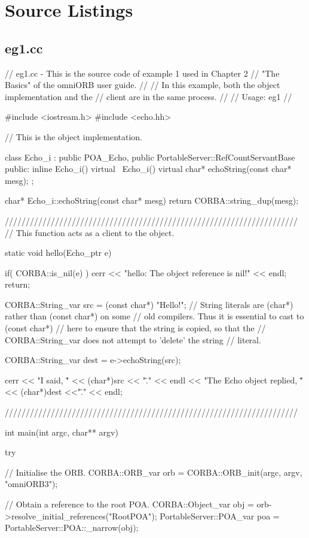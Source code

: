 \documentclass[11pt,twoside,a4paper]{book}
\begin{document}
\clearpage
\section{Source Listings}

\subsection{eg1.cc}

\begin{cxxlisting}
// eg1.cc - This is the source code of example 1 used in Chapter 2
//          "The Basics" of the omniORB user guide.
//
//          In this example, both the object implementation and the
//          client are in the same process.
//
// Usage: eg1
//

#include <iostream.h>
#include <echo.hh>

// This is the object implementation.

class Echo_i : public POA_Echo,
	       public PortableServer::RefCountServantBase
{
public:
  inline Echo_i() {}
  virtual ~Echo_i() {}
  virtual char* echoString(const char* mesg);
};

char* Echo_i::echoString(const char* mesg)
{
  return CORBA::string_dup(mesg);
}

//////////////////////////////////////////////////////////////////////
// This function acts as a client to the object.

static void hello(Echo_ptr e)
{
  if( CORBA::is_nil(e) ) {
    cerr << "hello: The object reference is nil!\n" << endl;
    return;
  }

  CORBA::String_var src = (const char*) "Hello!";
  // String literals are (char*) rather than (const char*) on some
  // old compilers.  Thus it is essential to cast to (const char*)
  // here to ensure that the string is copied, so that the
  // CORBA::String_var does not attempt to 'delete' the string
  // literal.

  CORBA::String_var dest = e->echoString(src);

  cerr << "I said, \"" << (char*)src << "\"." << endl
       << "The Echo object replied, \"" << (char*)dest <<"\"." << endl;
}

//////////////////////////////////////////////////////////////////////

int main(int argc, char** argv)
{
  try {
    // Initialise the ORB.
    CORBA::ORB_var orb = CORBA::ORB_init(argc, argv, "omniORB3");

    // Obtain a reference to the root POA.
    CORBA::Object_var obj = orb->resolve_initial_references("RootPOA");
    PortableServer::POA_var poa = PortableServer::POA::_narrow(obj);

}}
\end{cxxlisting}
\end{document}
